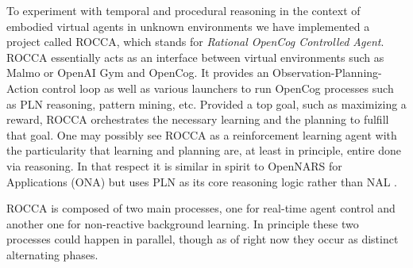 \documentclass[runningheads]{llncs}
\begin{document}

To experiment with temporal and procedural reasoning in the context of
embodied virtual agents in unknown environments we have implemented a
project called ROCCA, which stands for \emph{Rational OpenCog
Controlled Agent}.  ROCCA essentially acts as an interface between
virtual environments such as Malmo \cite{TODO} or OpenAI Gym
\cite{TODO} and OpenCog.  It provides an Observation-Planning-Action
control loop as well as various launchers to run OpenCog processes
such as PLN reasoning, pattern mining, etc.
Provided a top goal, such as maximizing a reward, ROCCA orchestrates
the necessary learning and the planning to fulfill that goal.
One may possibly see ROCCA as a reinforcement learning agent with the
particularity that learning and planning are, at least in principle,
entire done via reasoning.  In that respect it is similar in spirit to
OpenNARS for Applications (ONA) \cite{TODO} but uses PLN as its core
reasoning logic rather than NAL \cite{TODO}.

ROCCA is composed of two main processes, one for real-time agent
control and another one for non-reactive background learning.  In
principle these two processes could happen in parallel, though as of
right now they occur as distinct alternating phases.
\end{document}
